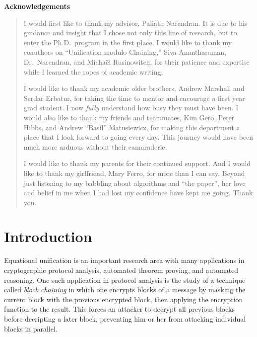\documentclass[11pt]{article}
\begin{document}
\newpage

\begin{center}
    \textbf{Acknowledgements}
\end{center}
\begin{quotation}
I would first like to thank my advisor, Paliath Narendran. It is due to his
guidance and insight that I chose not only this line of research, but to enter
the Ph.D.\ program in the first place.
I would like to thank my coauthors on ``Unification modulo Chaining,'' Siva
Anantharaman, Dr.\ Narendran, and Micha\"{e}l Rusinowitch, for their patience
and expertise while I learned the ropes of academic writing.

I would like to thank my academic older brothers, Andrew Marshall and Serdar
Erbatur, for taking the time to mentor and encourage a first year grad student.
I now \emph{fully} understand how busy they must have been.
I would also like to thank my friends and teammates, Kim Gero, Peter Hibbs, and
Andrew ``Basil'' Matusiewicz, for making this department a place that I look
forward to going every day. This journey would have been much more arduous
without their camaraderie.

I would like to thank my parents for their continued support.
And I would like to thank my girlfriend, Mary Ferro, for more than I can say.
Beyond just listening to my babbling about algorithms and ``the paper'', her
love and belief in me when I had lost my confidence have kept me going. Thank
you.
\end{quotation}

\newpage

\tableofcontents

\newpage
{}

\section{Introduction}\label{section:intro}

Equational unification is an important research area with many applications in
cryptographic protocol analysis, automated theorem proving, and automated
reasoning. One such application in protocol analysis is the study of a
technique called \emph{block chaining} in which one encrypts blocks of a
message by masking the current block with the previous encrypted block, then
applying the encryption function to the result. This forces an attacker to
decrypt all previous blocks before decripting a later block, preventing him or
her from attacking individual blocks in parallel.
\end{document}
